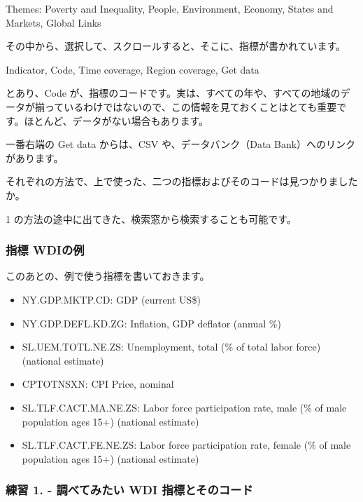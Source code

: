 \documentclass[
]{bxjsbook}
\providecommand{\tightlist}{%
  \setlength{\itemsep}{0pt}\setlength{\parskip}{0pt}}
\theoremstyle{definition}
\theoremstyle{definition}
\theoremstyle{definition}
\theoremstyle{definition}
\theoremstyle{remark}
\begin{document}
Themes: Poverty and Inequality, People, Environment, Economy, States and Markets, Global Links

その中から、選択して、スクロールすると、そこに、指標が書かれています。

Indicator, Code, Time coverage, Region coverage, Get data

とあり、Code が、指標のコードです。実は、すべての年や、すべての地域のデータが揃っているわけではないので、この情報を見ておくことはとても重要です。ほとんど、データがない場合もあります。

一番右端の Get data からは、CSV や、データバンク（Data Bank）へのリンクがあります。

それぞれの方法で、上で使った、二つの指標およびそのコードは見つかりましたか。

1 の方法の途中に出てきた、検索窓から検索することも可能です。

\hypertarget{ux6307ux6a19-wdiux306eux4f8b}{%
\subsubsection{指標 WDIの例}\label{ux6307ux6a19-wdiux306eux4f8b}}

このあとの、例で使う指標を書いておきます。

\begin{itemize}
\tightlist
\item
  NY.GDP.MKTP.CD: GDP (current US\$)
\item
  NY.GDP.DEFL.KD.ZG: Inflation, GDP deflator (annual \%)
\item
  SL.UEM.TOTL.NE.ZS: Unemployment, total (\% of total labor force) (national estimate)
\item
  CPTOTNSXN: CPI Price, nominal
\item
  SL.TLF.CACT.MA.NE.ZS: Labor force participation rate, male (\% of male population ages 15+) (national estimate)
\item
  SL.TLF.CACT.FE.NE.ZS: Labor force participation rate, female (\% of male population ages 15+) (national estimate)
\end{itemize}

\hypertarget{ux7df4ux7fd2-1.---ux8abfux3079ux3066ux307fux305fux3044-wdi-ux6307ux6a19ux3068ux305dux306eux30b3ux30fcux30c9}{%
\subsubsection{練習 1. - 調べてみたい WDI 指標とそのコード}\label{ux7df4ux7fd2-1.---ux8abfux3079ux3066ux307fux305fux3044-wdi-ux6307ux6a19ux3068ux305dux306eux30b3ux30fcux30c9}}
\end{document}
